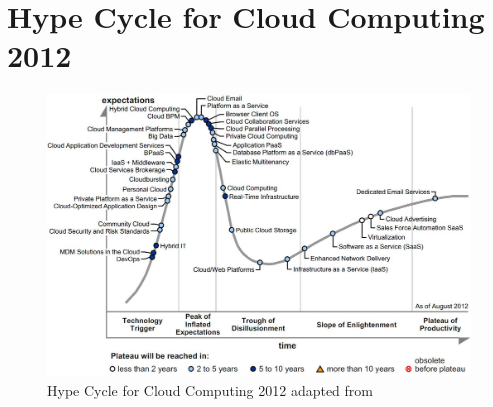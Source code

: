\chapter{Hype Cycle for Cloud Computing 2012}\label{ch:app03}

\begin{figure}[htb]
	\centering
	\includegraphics[width=\textwidth]{gfx/cloudCycle}
	\caption[Hype Cycle for Cloud Computing 2012]{Hype Cycle for Cloud Computing 2012 adapted from \citet[p. 5]{Smith2012}}
	\label{fig:cloudCycle}
\end{figure}